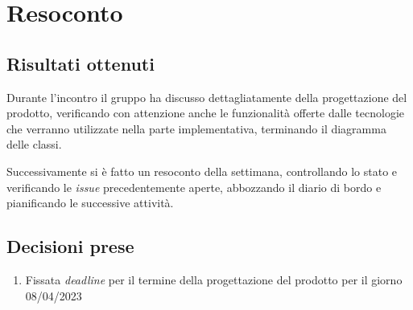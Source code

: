 \section{Resoconto}

\subsection{Risultati ottenuti}

Durante l'incontro il gruppo ha discusso dettagliatamente della progettazione del prodotto, verificando con attenzione anche le funzionalità offerte dalle tecnologie che verranno utilizzate nella parte implementativa, terminando il diagramma delle classi.

Successivamente si è fatto un resoconto della settimana, controllando lo stato e verificando le \textit{issue} precedentemente aperte, abbozzando il diario di bordo e pianificando le successive attività.

\subsection{Decisioni prese}

\begin{enumerate}

    \item Fissata \textit{deadline} per il termine della progettazione del prodotto per il giorno 08/04/2023

\end{enumerate}
